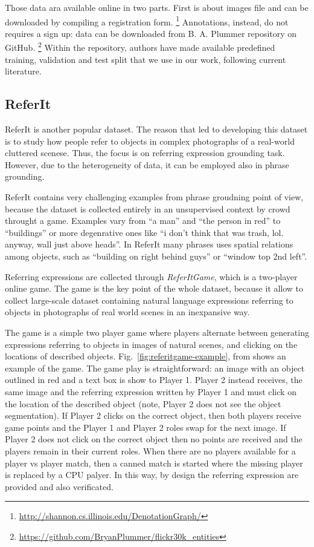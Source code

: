 Those data ara available online in two parts. First is about images
file and can be downloaded by compiling a registration form.
\footnote{\href{http://shannon.cs.illinois.edu/DenotationGraph/}{http://shannon.cs.illinois.edu/DenotationGraph/}}
Annotations, instead, do not requires a sign up: data can be
downloaded from B. A. Plummer repository on GitHub.
\footnote{\href{https://github.com/BryanPlummer/flickr30k\_entities}{https://github.com/BryanPlummer/flickr30k\_entities}}
Within the repository, authors have made available predefined
training, validation and test split that we use in our work, following
current literature.


\subsection{ReferIt}

ReferIt  is another popular dataset. The reason
that led to developing this dataset is to study how people refer to
objects in complex photographs of a real-world cluttered scenese.
Thus, the focus is on referring expression grounding task. However,
due to the heterogeneity of data, it can be employed also in phrase
grounding.

ReferIt contains very challenging examples from phrase groudning point
of view, because the dataset is collected entirely in an unsupervised
context by crowd throught a game. Examples vary from ``a man'' and
``the person in red'' to ``buildings'' or more degenrative ones like
``i don't think that was trash, lol. anyway, wall just above heads''.
In ReferIt many phrases uses spatial relations among objects, such as
``building on right behind guys'' or ``window top 2nd left''.

Referring expressions are collected through \textit{ReferItGame},
which is a two-player online game. The game is the key point of the
whole dataset, because it allow to collect large-scale dataset
containing natural language expressions referring to objects in
photographs of real world scenes in an inexpansive way.

The game is a simple two player game where players alternate between
generating expressions referring to objects in images of natural
scenes, and clicking on the locations of described objects.
Fig.~\ref{fig:referitgame-example}, from 
shows an example of the game. The game play is straightforward: an
image with an object outlined in red and a text box is show to Player
1. Player 2 instead receives, the same image and the referring
expression written by Player 1 and must click on the location of the
described object (note, Player 2 does not see the object
segmentation). If Player 2 clicks on the correct object, then both
players receive game points and the Player 1 and Player 2 roles swap
for the next image. If Player 2 does not click on the correct object
then no points are received and the players remain in their current
roles. When there are no players available for a player vs player
match, then a canned match is started where the missing player is
replaced by a CPU palyer. In this way, by design the referring
expression are provided and also verificated. 

